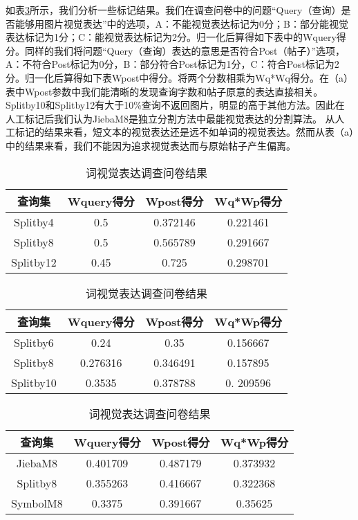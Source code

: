 如表\ref{tab:poem_result}所示，我们分析一些标记结果。我们在调查问卷中的问题“Query（查询）是否能够用图片视觉表达”中的选项，A：不能视觉表达标记为0分；B：部分能视觉表达标记为1分；C：能视觉表达标记为2分。归一化后算得如下表中的Wquery得分。同样的我们将问题“Query（查询）表达的意思是否符合Post（帖子）”选项，A：不符合Post标记为0分，B：部分符合Post标记为1分，C：符合Post标记为2分。归一化后算得如下表Wpost中得分。将两个分数相乘为Wq*Wq得分。在（a）表中Wpost参数中我们能清晰的发现查询字数和帖子原意的表达直接相关。Splitby10和Splitby12有大于10\%查询不返回图片，明显的高于其他方法。因此在人工标记后我们认为JiebaM8是独立分割方法中最能视觉表达的分割算法。
从人工标记的结果来看，短文本的视觉表达还是远不如单词的视觉表达。然而从表（a）中的结果来看，我们不能因为追求视觉表达而与原始帖子产生偏离。
\begin{table}[htp]
\centering
\caption{词视觉表达调查问卷结果} \label{tab:poem_result}
\begin{tabular}{ |c|c|c|c|}
    \hline
		查询集 & Wquery得分 & Wpost得分 & Wq*Wp得分 \\
	\hline
		Splitby4 &  0.5 & 0.372146 & 0.221461 \\ 
	\hline
		Splitby8 &  0.5 & 0.565789 & 0.291667 \\
	\hline
		Splitby12 & 0.45 & 0.725 &  0.298701  \\
 	\hline
\end{tabular}
\begin{tabular}{ |c|c|c|c|}
    \hline
		查询集 & Wquery得分 & Wpost得分 & Wq*Wp得分 \\
	\hline
		Splitby6 &  0.24 & 0.35 & 0.156667 \\ 
	\hline
		Splitby8 &  0.276316 & 0.346491 & 0.157895 \\
	\hline
		Splitby10 & 0.3535 & 0.378788 &  0. 209596 \\
 	\hline
\end{tabular}
\begin{tabular}{ |c|c|c|c|}
    \hline
		查询集 & Wquery得分 & Wpost得分 & Wq*Wp得分 \\
	\hline
		JiebaM8 &  0.401709 & 0.487179 & 0.373932 \\ 
	\hline
		Splitby8 &  0.355263 & 0.416667 & 0.322368 \\
	\hline
		SymbolM8 & 0.3375 & 0.391667 &  0.35625 \\
 	\hline
\end{tabular}
\end{table}




